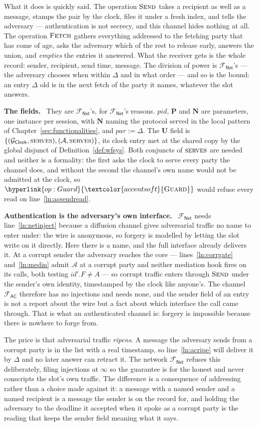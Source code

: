 \documentclass[10pt,oneside,openany]{book}
\newcommand{\Ps}{\mathbf{P}}
\newcommand{\PID}{\mathit{pid}}
\newcommand{\admits}{\mathbf{N}}
\newcommand{\pars}{\mathit{par}}
\newcommand{\uses}{\mathbf{U}}
\newcommand{\serves}{\op{serves}}
\newcommand{\Adv}{\mathcal{A}}
\newcommand{\op}[1]{\textnormal{\textsc{#1}}}
\newcommand{\opl}[1]{\hyperlink{op:#1}{\textcolor{accentsoft}{\op{#1}}}}
\newcommand{\id}{id}
\newcommand{\Gclock}{\mathcal{G}_{\mathsf{Clock}}}
\newcommand{\Fnet}{\mathcal{F}_{\mathsf{Net}}}
\newcommand{\Fac}{\mathcal{F}_{\mathsf{AC}}}
\newcommand{\heading}[1]{\medskip\par\noindent\textcolor{accent}{\textbf{#1.}}\ }
\theoremstyle{accentdef}
\theoremstyle{accentplain}
\begin{document}
What it does is quickly said. The operation $\op{Send}$ takes a recipient as well as a message, stamps the pair
by the clock, files it under a fresh index, and tells the adversary --- authentication is not
secrecy, and this channel hides nothing at all. The operation $\op{Fetch}$ gathers everything addressed to the
fetching party that has come of age, asks the adversary which of the rest to release early,
answers the union, and \emph{empties} the entries it answered. What the receiver gets is the whole
record: sender, recipient, send time, message. The division of power is $\Fnet$'s --- the
adversary chooses when within $\Delta$ and in what order --- and so is the bound: an entry
$\Delta$ old is in the next fetch of the party it names, whatever the slot answers.

\heading{The fields} They are $\Fnet$'s, for $\Fnet$'s reasons. $\PID$, $\Ps$ and $\admits$ are
parameters, one instance per session, with $\admits$ naming the protocol served in the local
pattern of Chapter~\ref{sec:functionalities}, and $\pars := \Delta$. The $\uses$ field is
$\{(\Gclock,\serves),(\Adv,\serves)\}$, its clock entry met at the shared copy by the global
disjunct of Definition~\ref{def:wfsys}. Both conjuncts of $\serves$ are needed and neither is a
formality: the first asks the clock to serve every party the channel does, and without the second
the channel's own name would not be admitted at the clock, so $\opl{Guard}$ would refuse every
read on line~\ref{ln:acsendread}.

\heading{Authentication is the adversary's own interface} $\Fnet$ needs
line~\ref{ln:netinject} because a diffusion channel gives adversarial traffic no name to enter
under: the wire is anonymous, so forgery is modelled by letting the slot write on it directly.
Here there is a name, and the full interface already delivers it. At a corrupt sender the
adversary reaches the core --- lines~\ref{ln:corrgate} and~\ref{ln:medin} admit $\Adv$ at a
corrupt party and neither mediation hook fires on its calls, both testing $\id'.F \neq A$ --- so
corrupt traffic enters through $\op{Send}$ under the sender's own identity, timestamped by the
clock like anyone's. The channel $\Fac$ therefore has no injections and needs none, and the sender field of an
entry is not a report about the wire but a fact about which interface the call came through. That
is what an authenticated channel is: forgery is impossible because there is nowhere to forge from.

The price is that adversarial traffic \emph{ripens}. A message the adversary sends from a corrupt
party is in the list with a real timestamp, so line~\ref{ln:acripe} will deliver it by $\Delta$
and no later answer can retract it. The network $\Fnet$ refuses this deliberately, filing injections at
$\infty$ so the guarantee is for the honest and never conscripts the slot's own traffic. The
difference is a consequence of addressing rather than a choice made against it: a message with a
named sender and a named recipient is a message the sender is on the record for, and holding the
adversary to the deadline it accepted when it spoke as a corrupt party is the reading that keeps
the sender field meaning what it says.
\end{document}
